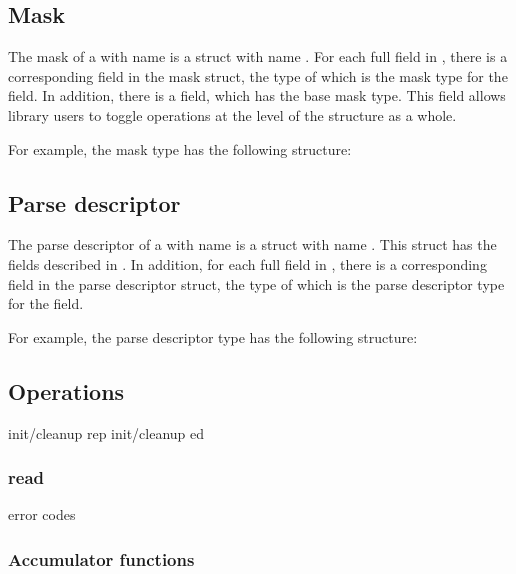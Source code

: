 \subsection{Mask}
\label{sec:structs-masks}
The mask of a \Pstruct{} with name  is a \C{} struct 
with name .  For each full field in
, there is a corresponding field in the mask struct, the
type of which is the mask type for
the field.  In addition, there is a 
 field, which has the base mask type.  This field allows
library users to toggle operations at the level of the structure as a
whole. 

For example, the mask type  has the
following structure:


\subsection{Parse descriptor}
\label{sec:structs-parse-descriptors}
The parse descriptor of a \Pstruct{} with name  is a \C{}
struct with name .  This struct has the fields
described in . In addition, for
each full field in , there is a corresponding field in
the parse descriptor struct, the type of which is the parse descriptor
type for the field.

For example, the parse descriptor type  has
the following structure:

\subsection{Operations}
init/cleanup rep
init/cleanup ed
\subsubsection{read}
  error codes
\subsubsection{Accumulator functions}

